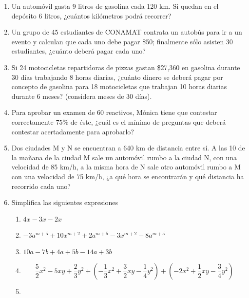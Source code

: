 \documentclass[12pt,letterpaper]{report}
\begin{document}
\begin{enumerate}
\begin{itemize}
\begin{equation*}
\left(\sqrt[4]{9} \right)^4
\end{equation*}
\item[g)]
\begin{equation*}
5\sqrt{8}-\sqrt{27}-\sqrt{32}+3\sqrt{3}+\sqrt{2}
\end{equation*}
\item[h)]
\begin{equation*}
\sqrt{200}+\sqrt{50}-\sqrt{98}-\sqrt{338}
\end{equation*}
\end{itemize}
\item Un automóvil gasta 9 litros de gasolina cada 120 km. Si quedan en el depósito 6 litros, ¿cuántos kilómetros podrá
recorrer? 
\item Un grupo de 45 estudiantes de CONAMAT contrata un autobús para ir a un evento y calculan que cada uno debe pagar
\$50; finalmente sólo asisten 30 estudiantes, ¿cuánto deberá pagar cada uno?
\item Si 24 motocicletas repartidoras de pizzas gastan \$27,360 en gasolina durante 30 días trabajando 8 horas diarias,
¿cuánto dinero se deberá pagar por concepto de gasolina para 18 motocicletas que trabajan 10 horas diarias durante
6 meses? (considera meses de 30 días).
\item Para aprobar un examen de 60 reactivos, Mónica tiene que contestar correctamente 75\% de éste, ¿cuál es el mínimo
de preguntas que deberá contestar acertadamente para aprobarlo?
\item Dos ciudades M y N se encuentran a 640 km de distancia entre sí. A las 10 de la mañana de la ciudad M sale un
automóvil rumbo a la ciudad N, con una velocidad de 85
km/h, a la misma hora de N sale otro automóvil rumbo a M
con una velocidad de 75
km/h, ¿a qué hora se encontrarán y qué distancia ha recorrido cada uno?
\item Simplifica las siguientes expresiones
\begin{enumerate}
\item $4x-3x-2x$
\item $-3a^{m+5}+10x^{m+2}+2a^{m+5}-3x^{m+2}-8a^{m+5}$
\item $10a-7b+4a+5b-14a+3b$
\item
\begin{equation*}
\frac{5}{2}x^2-5xy+\frac{2}{3}y^2+\left(-\frac{1}{3}x^2+\frac{3}{2}xy-\frac{1}{4}y^2 \right)+\left(-2x^2+\frac{1}{2}xy-\frac{3}{4}y^2 \right)
\end{equation*}
\item

\end{enumerate}
\end{enumerate}
\end{document}
